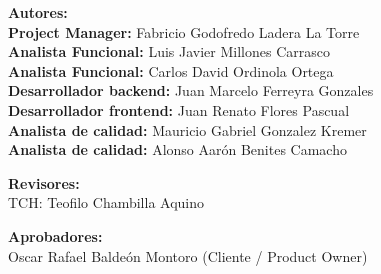 \vspace{18pt}

\noindent\textbf{Autores:}\\
\textbf{Project Manager:} Fabricio Godofredo Ladera La Torre\\
\textbf{Analista Funcional:} Luis Javier Millones Carrasco\\
\textbf{Analista Funcional:} Carlos David Ordinola Ortega\\
\textbf{Desarrollador backend:} Juan Marcelo Ferreyra Gonzales\\
\textbf{Desarrollador frontend:} Juan Renato Flores Pascual\\
\textbf{Analista de calidad:} Mauricio Gabriel Gonzalez Kremer\\
\textbf{Analista de calidad:} Alonso Aarón Benites Camacho

\vspace{10pt}

\noindent\textbf{Revisores:}\\
TCH: Teofilo Chambilla Aquino

\vspace{10pt}

\noindent\textbf{Aprobadores:}\\
Oscar Rafael Baldeón Montoro (Cliente / Product Owner)
